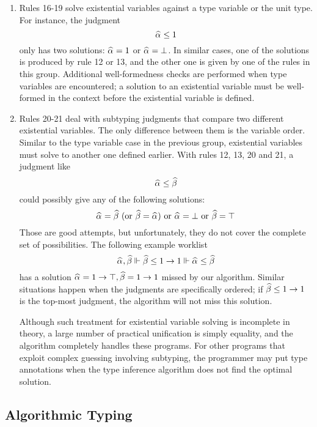 \begin{enumerate}
    \item Rules 16-19 solve existential variables against a type variable or the unit type.
        For instance, the judgment
        \[\al \le 1\]
        only has two solutions: $\al = 1$ or $\al = \bot$.
        In similar cases, one of the solutions is produced by rule 12 or 13,
        and the other one is given by one of the rules in this group.
        Additional well-formedness checks are performed when type variables are encountered;
        a solution to an existential variable must be well-formed in the context
        before the existential variable is defined.
    
    \item Rules 20-21 deal with subtyping judgments
        that compare two different existential variables.
        The only difference between them is the variable order.
        Similar to the type variable case in the previous group,
        existential variables must solve to another one defined earlier.
        With rules 12, 13, 20 and 21, a judgment like
        \[\al \le \bt\]
        could possibly give any of the following solutions:
        \[ \al = \bt ~(\text{or } \bt = \al)
            \text{ or } \al = \bot \text{ or } \bt = \top \]
        Those are good attempts, but unfortunately,
        they do not cover the complete set of possibilities.
        The following example worklist
        \[ \al, \bt \Vdash \bt \le 1 \to 1 \Vdash \al \le \bt \]
        has a solution $\al = 1 \to \top, \bt = 1 \to 1$ missed by our algorithm.
        Similar situations happen when the judgments are specifically ordered;
        if $\bt \le 1 \to 1$ is the top-most judgment,
        the algorithm will not miss this solution.

        Although such treatment for existential variable solving is incomplete in theory,
        a large number of practical unification is simply equality,
        and the algorithm completely handles these programs.
        For other programs that exploit complex guessing involving subtyping,
        the programmer may put type annotations when the type inference algorithm
        does not find the optimal solution.
\end{enumerate}


\subsection{Algorithmic Typing}

